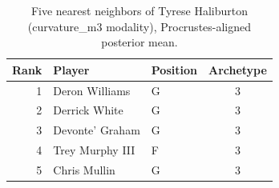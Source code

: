 \begin{table}[htbp]
  \centering\small
  \begin{tabular}{rllc}
    \toprule
    Rank & Player & Position & Archetype \\
    \midrule
    1 & Deron Williams & G & 3 \\
    2 & Derrick White & G & 3 \\
    3 & Devonte' Graham & G & 3 \\
    4 & Trey Murphy III & F & 3 \\
    5 & Chris Mullin & G & 3 \\
    \bottomrule
  \end{tabular}
  \caption{Five nearest neighbors of Tyrese Haliburton (curvature_m3 modality), Procrustes-aligned posterior mean.}
  \label{tab:Tyrese_Haliburton_neighbors_curvature_m3}
\end{table}

